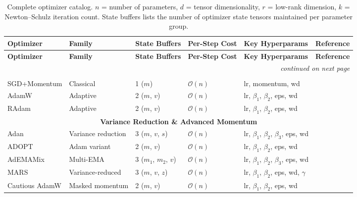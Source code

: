 \footnotesize
\begin{longtable}{p{2.0cm}p{2.0cm}p{2.2cm}p{2.0cm}p{3.8cm}p{2.5cm}}
\toprule
\textbf{Optimizer} & \textbf{Family} & \textbf{State Buffers} & \textbf{Per-Step Cost} & \textbf{Key Hyperparams} & \textbf{Reference} \\
\midrule
\endfirsthead
\toprule
\textbf{Optimizer} & \textbf{Family} & \textbf{State Buffers} & \textbf{Per-Step Cost} & \textbf{Key Hyperparams} & \textbf{Reference} \\
\midrule
\endhead
\midrule
\multicolumn{6}{r}{\textit{continued on next page}} \\
\endfoot
\bottomrule
\caption{Complete optimizer catalog. $n$ = number of parameters, $d$ = tensor dimensionality, $r$ = low-rank dimension, $k$ = Newton--Schulz iteration count. State buffers lists the number of optimizer state tensors maintained per parameter group.}
\label{tab:all-optimizers}
\endlastfoot

\multicolumn{6}{c}{\textbf{Classical \& Adaptive Baselines}} \\
\midrule
SGD+Momentum & Classical & 1 ($m$) & $\mathcal{O}(n)$ & lr, momentum, wd & \citep{polyak_1964} \\
AdamW & Adaptive & 2 ($m$, $v$) & $\mathcal{O}(n)$ & lr, $\beta_1$, $\beta_2$, eps, wd & \citep{loshchilov_decoupled_2017} \\
RAdam & Adaptive & 2 ($m$, $v$) & $\mathcal{O}(n)$ & lr, $\beta_1$, $\beta_2$, eps, wd & \citep{liu_variance_2019} \\
\midrule

\multicolumn{6}{c}{\textbf{Variance Reduction \& Advanced Momentum}} \\
\midrule
Adan & Variance reduction & 3 ($m$, $v$, $s$) & $\mathcal{O}(n)$ & lr, $\beta_1$, $\beta_2$, $\beta_3$, eps, wd & \citep{xie_adan_2022} \\
ADOPT & Adam variant & 2 ($m$, $v$) & $\mathcal{O}(n)$ & lr, $\beta_1$, $\beta_2$, eps, wd & \citep{taniguchi_adopt_2024} \\
AdEMAMix & Multi-EMA & 3 ($m_1$, $m_2$, $v$) & $\mathcal{O}(n)$ & lr, $\beta_1$, $\beta_2$, $\beta_3$, eps, wd & \citep{pagliardini_ademamix_2024} \\
MARS & Variance-reduced & 3 ($m$, $v$, $z$) & $\mathcal{O}(n)$ & lr, $\beta_1$, $\beta_2$, eps, wd, $\gamma$ & \citep{yuan_mars_2024} \\
Cautious AdamW & Masked momentum & 2 ($m$, $v$) & $\mathcal{O}(n)$ & lr, $\beta_1$, $\beta_2$, eps, wd & \citep{liang_cautious_2024} \\
\midrule


\end{longtable}
